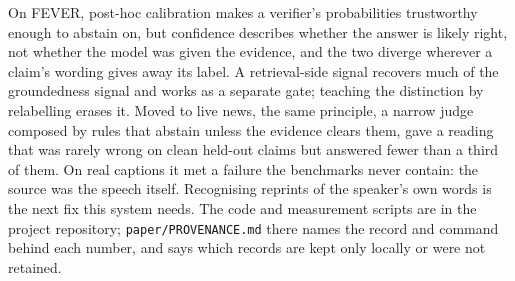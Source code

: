 \documentclass[11pt]{article}
\begin{document}
On FEVER, post-hoc calibration makes a verifier's probabilities trustworthy enough to abstain on, but
confidence describes whether the answer is likely right, not whether the model was given the evidence, and
the two diverge wherever a claim's wording gives away its label. A retrieval-side signal recovers much of
the groundedness signal and works as a separate gate; teaching the distinction by relabelling erases it.
Moved to live news, the same principle, a narrow judge composed by rules that abstain unless the evidence
clears them, gave a reading that was rarely wrong on clean held-out claims but answered fewer than a third
of them. On real captions it met a failure the benchmarks never contain: the source was the speech itself.
Recognising reprints of the speaker's own words is the next fix this system needs. The code and
measurement scripts are in the project repository; \texttt{paper/PROVENANCE.md} there names the record and
command behind each number, and says which records are kept only locally or were not retained.



\end{document}

